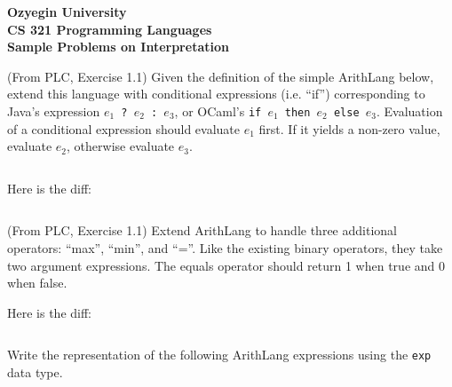 \documentclass[addpoints]{exam}
\begin{document}
\begin{center}
{\Large \textbf{
    Ozyegin University\\
    CS 321 Programming Languages\\
    Sample Problems on Interpretation
}}
\end{center}

\begin{questions}
  \question
  (From PLC, Exercise 1.1)
  Given the definition of the simple ArithLang below,
  extend this language with conditional expressions (i.e. ``if'')
  corresponding to Java's expression \texttt{$e_1$ ? $e_2$ : $e_3$},
  or OCaml's \texttt{if $e_1$ then $e_2$ else $e_3$}.
  Evaluation of a conditional expression should evaluate $e_1$ first.
  If it yields a non-zero value, evaluate $e_2$, otherwise evaluate $e_3$.
  
  \inputminted{ocaml}{arith.ml}

  \begin{solutionbox}{9cm}
    Here is the diff:
    \inputminted{diff}{arith_if_diff.txt}
  \end{solutionbox}


  \newpage
  \question
  (From PLC, Exercise 1.1)
  Extend ArithLang to handle three additional operators:
  ``max'', ``min'', and ``=''.
  Like the existing binary operators,
  they take two argument expressions.
  The equals operator should return 1 when true and 0 when false.

  \begin{solutionbox}{14cm}
    Here is the diff:
    \inputminted{diff}{arith_minmaxeq_diff.txt}
  \end{solutionbox}

  
  \question
  Write the representation of the following ArithLang expressions
  using the \texttt{exp} data type.
\end{questions}
\end{document}
